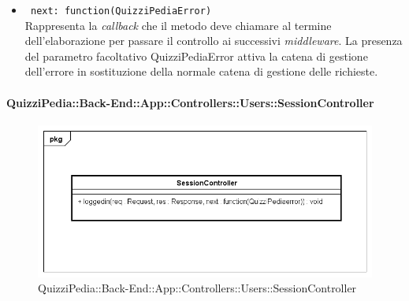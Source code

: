\begin{itemize}
\begin{itemize}
\begin{itemize}
		  \item
			\texttt{ next: function(QuizziPediaError)} \\
			Rappresenta la \textit{callback} che il metodo deve chiamare al termine dell'elaborazione per passare il controllo ai successivi \textit{middleware}. La presenza del parametro facoltativo QuizziPediaError attiva la catena di gestione dell'errore in sostituzione della normale catena di gestione delle richieste.		 	
		 \end{itemize} 	 		
	\end{itemize}	
\end{itemize}	
\paragraph{QuizziPedia::Back-End::App::Controllers::Users::SessionController}
\label{QuizziPedia::Back-End::App::Controllers::Users::SessionController}
\begin{figure}[ht]
	\centering
	\includegraphics[scale=0.45]{UML/Classi/Back-End/QuizziPedia_Back-End_App_Controllers_Users_SessionController.png}
	\caption{QuizziPedia::Back-End::App::Controllers::Users::SessionController}
\end{figure}
\FloatBarrier
